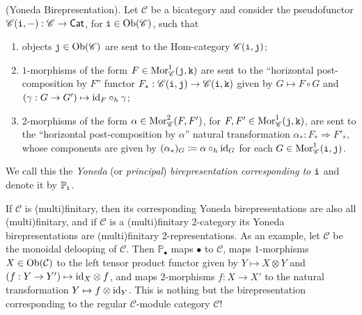 \noindent\begin{definition}\label{YonedaBirepresentation}\textnormal{(Yoneda Birepresentation)}. Let $\mathscr{C}$ be a bicategory and consider the pseudofunctor $\mathscr{C}(\textnormal{\texttt{i}}, -) : \mathscr{C} \to \textnormal{\textsf{Cat}}$, for $\textnormal{\texttt{i}} \in \textnormal{Ob}(\mathscr{C})$, such that
\begin{enumerate}[label=$\bullet$, leftmargin=4\parindent]
\item objects $\textnormal{\texttt{j}} \in \textnormal{Ob}(\mathscr{C})$ are sent to the Hom-category $\mathscr{C}(\textnormal{\texttt{i}}, \textnormal{\texttt{j}})$;
\item $1$-morphisms of the form $F \in \textnormal{Mor}_\mathscr{C}^1(\textnormal{\texttt{j}}, \textnormal{\texttt{k}})$ are sent to the ``horizontal post-composition by $F$'' functor $F_* : \mathscr{C}(\textnormal{\texttt{i}}, \textnormal{\texttt{j}}) \to \mathscr{C}(\textnormal{\texttt{i}}, \textnormal{\texttt{k}})$ given by $G \mapsto F \circ G$ and $(\gamma : G \to G') \mapsto \textnormal{id}_F \circ_h \gamma$;
\item $2$-morphisms of the form $\alpha \in \textnormal{Mor}_\mathscr{C}^2(F, F')$, for $F, F' \in \textnormal{Mor}_\mathscr{C}^1(\textnormal{\texttt{j}}, \textnormal{\texttt{k}})$, are sent to the ``horizontal post-composition by $\alpha$'' natural transformation $\alpha_* : F_* \Rightarrow F'_*$, whose components are given by $(\alpha_*)_G \coloneqq \alpha \circ_h \textnormal{id}_G$ for each $G \in \textnormal{Mor}_\mathscr{C}^1(\textnormal{\texttt{i}}, \textnormal{\texttt{j}})$. %
\end{enumerate}
\noindent We call this the {\em Yoneda} (or {\em principal}) {\em birepresentation corresponding to $\textnormal{\texttt{i}}$} and denote it by $\mathbb{P}_{\textnormal{\texttt{i}}}$.\\
\end{definition}

\noindent If $\mathscr{C}$ is (multi)finitary, then its corresponding Yoneda birepresentations are also all (multi)finitary, and if $\mathscr{C}$ is a (multi)finitary $2$-category its Yoneda birepresentations are (multi)finitary $2$-representations. As an example, let $\mathscr{C}$ be the monoidal delooping of $\mathcal{C}$. Then $\mathbb{P}_\bullet$ maps $\bullet$ to $\mathcal{C}$, maps $1$-morphisms $X \in \textnormal{Ob}(\mathcal{C})$ to the left tensor product functor given by $Y \mapsto X \otimes Y$ and $(f : Y \to Y') \mapsto \textnormal{id}_X \otimes f$, and maps $2$-morphisms $f : X \to X'$ to the natural transformation $Y \mapsto f \otimes \textnormal{id}_Y$. This is nothing but the birepresentation corresponding to the regular $\mathcal{C}$-module category $\mathcal{C}$! %
\newpage

